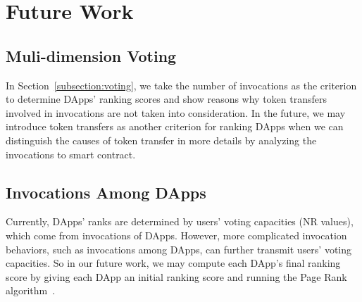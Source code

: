 \section{Future Work}

\subsection{Muli-dimension Voting}
\noindent
In Section~\ref{subsection:voting}, we take the number of invocations as the
criterion to determine DApps' ranking scores and show reasons why token
transfers involved in invocations are not taken into consideration. In the
future, we may introduce token transfers as another criterion for ranking DApps
when we can distinguish the causes of token transfer in more details by
analyzing the invocations to smart contract.

\subsection{Invocations Among DApps}
\noindent
Currently, DApps' ranks are determined by users' voting capacities (NR values),
which come from invocations of DApps. However, more complicated invocation
behaviors, such as invocations among DApps, can further transmit users' voting
capacities. So in our future work, we may compute each DApp's final ranking
score by giving each DApp an initial ranking score and running the Page Rank
algorithm~\cite{page1999pagerank}.
